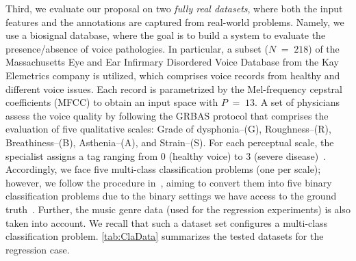 \documentclass[journal]{IEEEtran}
\DeclareMathOperator{\igual}{\!\,=\!\,}
\begin{document}
Third, we evaluate our proposal on two \textit{fully real datasets}, where both the input features and the annotations are captured from real-world problems. Namely, we use a biosignal database, where the goal is to build a system to evaluate the presence/absence of voice pathologies. In particular, a subset ($N\igual218$) of the Massachusetts Eye and Ear Infirmary Disordered Voice Database from the Kay Elemetrics company is utilized, which comprises voice records from healthy and different voice issues.  Each record is parametrized by the Mel-frequency cepstral coefficients (MFCC) to obtain an input space with $P\igual13$.  A set of physicians assess the voice quality by following the GRBAS protocol that comprises the evaluation of five qualitative scales: Grade of dysphonia--(G), Roughness--(R), Breathiness--(B), Asthenia--(A), and Strain--(S). For each perceptual scale, the specialist assigns a tag ranging from 0 (healthy voice) to 3 (severe disease)~\cite{arias2011automatic}. Accordingly, we face five multi-class classification problems (one per scale); however, we follow the procedure in~\cite{gil2018learning}, aiming to convert them into five binary classification problems due to the binary settings we have access to the ground truth~\cite{gonzalez2015automatic}. Further, the music genre data (used for the regression experiments) is also taken into account. We recall that such a dataset set configures a multi-class classification problem. \cref{tab:ClaData} summarizes the tested datasets for the regression case.
\end{document}
